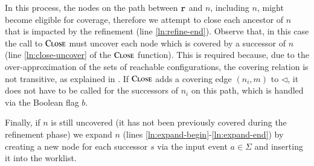 \documentclass[10pt]{llncs}
\begin{document}
In this process, the nodes on the path between $\mathtt{r}$ and $n$,
including $n$, might become eligible for coverage, therefore we
attempt to close each ancestor of $n$ that is impacted by the
refinement (line \ref{ln:refine-end}). Observe that, in this case the
call to $\Call{Close}{}$ must uncover each node which is covered by a
successor of $n$ (line \ref{ln:close-uncover} of the $\Call{Close}{}$
function). This is required because, due to the over-approximation of
the sets of reachable configurations, the covering relation is not
transitive, as explained in \cite{mcmillan06}. If $\Call{Close}{}$
adds a covering edge $(n_i,m)$ to $\lhd$, it does not have to be
called for the successors of $n_i$ on this path, which is handled via
the Boolean flag $b$.

Finally, if $n$ is still uncovered (it has not been previously covered
during the refinement phase) we expand $n$ (lines
\ref{ln:expand-begin}-\ref{ln:expand-end}) by creating a new node for
each successor $s$ via the input event $a \in \Sigma$ and inserting it
into the worklist.
\end{document}
